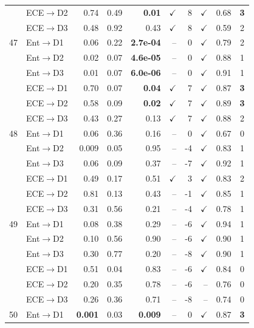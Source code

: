 \begin{table}[t]
\begin{tabular}{cl rrr rr rr c}
\rowcolor{gray!15}  & ECE$\to$D2 & 0.74 & 0.49 & \textbf{0.01} & $\checkmark$ & 8 & $\checkmark$ & 0.68 & \textbf{3} \\
 & ECE$\to$D3 & 0.48 & 0.92 & 0.43 & $\checkmark$ & 8 & $\checkmark$ & 0.59 & 2 \\
\midrule
47 & Ent$\to$D1 & 0.06 & 0.22 & \textbf{2.7e-04} & -- & 0 & $\checkmark$ & 0.79 & 2 \\
 & Ent$\to$D2 & 0.02 & 0.07 & \textbf{4.6e-05} & -- & 0 & $\checkmark$ & 0.88 & 1 \\
 & Ent$\to$D3 & 0.01 & 0.07 & \textbf{6.0e-06} & -- & 0 & $\checkmark$ & 0.91 & 1 \\
\rowcolor{gray!15}  & ECE$\to$D1 & 0.70 & 0.07 & \textbf{0.04} & $\checkmark$ & 7 & $\checkmark$ & 0.87 & \textbf{3} \\
\rowcolor{gray!15}  & ECE$\to$D2 & 0.58 & 0.09 & \textbf{0.02} & $\checkmark$ & 7 & $\checkmark$ & 0.89 & \textbf{3} \\
 & ECE$\to$D3 & 0.43 & 0.27 & 0.13 & $\checkmark$ & 7 & $\checkmark$ & 0.88 & 2 \\
\midrule
48 & Ent$\to$D1 & 0.06 & 0.36 & 0.16 & -- & 0 & $\checkmark$ & 0.67 & 0 \\
 & Ent$\to$D2 & 0.009 & 0.05 & 0.95 & -- & -4 & $\checkmark$ & 0.83 & 1 \\
 & Ent$\to$D3 & 0.06 & 0.09 & 0.37 & -- & -7 & $\checkmark$ & 0.92 & 1 \\
 & ECE$\to$D1 & 0.49 & 0.17 & 0.51 & $\checkmark$ & 3 & $\checkmark$ & 0.83 & 2 \\
 & ECE$\to$D2 & 0.81 & 0.13 & 0.43 & -- & -1 & $\checkmark$ & 0.85 & 1 \\
 & ECE$\to$D3 & 0.31 & 0.56 & 0.21 & -- & -4 & $\checkmark$ & 0.78 & 1 \\
\midrule
49 & Ent$\to$D1 & 0.08 & 0.38 & 0.29 & -- & -6 & $\checkmark$ & 0.94 & 1 \\
 & Ent$\to$D2 & 0.10 & 0.56 & 0.90 & -- & -6 & $\checkmark$ & 0.90 & 1 \\
 & Ent$\to$D3 & 0.30 & 0.77 & 0.20 & -- & -8 & $\checkmark$ & 0.90 & 1 \\
 & ECE$\to$D1 & 0.51 & 0.04 & 0.83 & -- & -6 & $\checkmark$ & 0.84 & 0 \\
 & ECE$\to$D2 & 0.20 & 0.35 & 0.78 & -- & -6 & -- & 0.76 & 0 \\
 & ECE$\to$D3 & 0.26 & 0.36 & 0.71 & -- & -8 & -- & 0.74 & 0 \\
\midrule
\rowcolor{gray!15} 50 & Ent$\to$D1 & \textbf{0.001} & 0.03 & \textbf{0.009} & -- & 0 & $\checkmark$ & 0.87 & \textbf{3} \\

\end{tabular}
\end{table}
